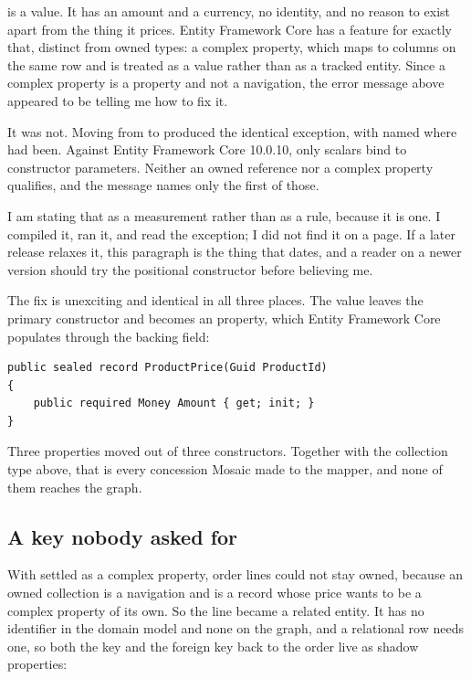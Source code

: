 %
 is a value. It has an amount and a currency, no identity, and no
reason to exist apart from the thing it prices. Entity Framework Core has a
feature for exactly that, distinct from owned types: a complex property, which
maps to columns on the same row and is treated as a value rather than as a
tracked entity. Since a complex property is a property and not a navigation, the
error message above appeared to be telling me how to fix it.

It was not. Moving  from  to
 produced the identical exception, with 
named where  had been. Against Entity Framework Core 10.0.10, only
scalars bind to constructor parameters. Neither an owned reference nor a complex
property qualifies, and the message names only the first of those.

I am stating that as a measurement rather than as a rule, because it is one. I
compiled it, ran it, and read the exception; I did not find it on a page. If a
later release relaxes it, this paragraph is the thing that dates, and a reader
on a newer version should try the positional constructor before believing me.

%
The fix is unexciting and identical in all three places. The value leaves the
primary constructor and becomes an  property, which Entity Framework
Core populates through the backing field:

\begin{verbatim}
public sealed record ProductPrice(Guid ProductId)
{
    public required Money Amount { get; init; }
}
\end{verbatim}

Three properties moved out of three constructors. Together with the collection
type above, that is every concession Mosaic made to the mapper, and none of them
reaches the graph.

\subsection*{A key nobody asked for}

%
With  settled as a complex property, order lines could not stay
owned, because an owned collection is a navigation and  is a
record whose price wants to be a complex property of its own. So the line became
a related entity. It has no identifier in the domain model and none on the
graph, and a relational row needs one, so both the key and the foreign key back
to the order live as shadow properties:


